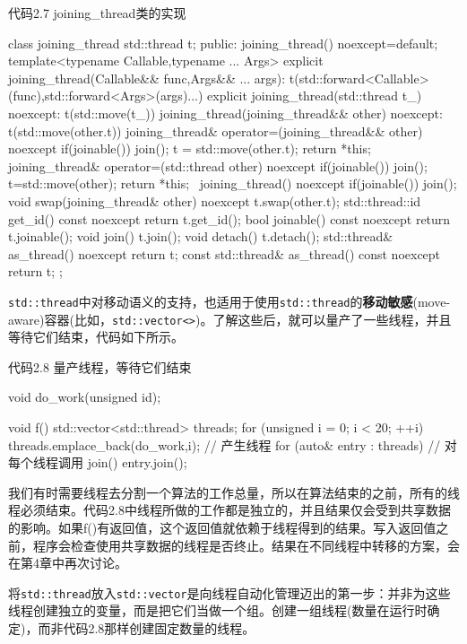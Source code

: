 代码2.7 joining\_thread类的实现

\begin{cpp}
class joining_thread
{
  std::thread t;
public:
  joining_thread() noexcept=default;
  template<typename Callable,typename ... Args>
  explicit joining_thread(Callable&& func,Args&& ... args):
    t(std::forward<Callable>(func),std::forward<Args>(args)...)
  {}
  explicit joining_thread(std::thread t_) noexcept:
    t(std::move(t_))
  {}
  joining_thread(joining_thread&& other) noexcept:
    t(std::move(other.t))
  {}
  joining_thread& operator=(joining_thread&& other) noexcept
  {
    if(joinable()){
      join();
    }
    t = std::move(other.t);
    return *this;
  }
  joining_thread& operator=(std::thread other) noexcept
  {
    if(joinable())
      join();
    t=std::move(other);
    return *this;
  }
  ~joining_thread() noexcept
  {
    if(joinable())
    join();
  }
  void swap(joining_thread& other) noexcept
  {
    t.swap(other.t);
  }
  std::thread::id get_id() const noexcept{
    return t.get_id();
  }
  bool joinable() const noexcept
  {
    return t.joinable();
  }
  void join()
  {
    t.join();
  }
  void detach()
  {
    t.detach();
  }
  std::thread& as_thread() noexcept
  {
    return t;
  }
  const std::thread& as_thread() const noexcept
  {
    return t;
  }
};
\end{cpp}

\texttt{std::thread}中对移动语义的支持，也适用于使用\texttt{std::thread}的\textbf{移动敏感}(move-aware)容器(比如，\texttt{std::vector<>})。了解这些后，就可以量产了一些线程，并且等待它们结束，代码如下所示。

代码2.8 量产线程，等待它们结束

\begin{cpp}
void do_work(unsigned id);

void f()
{
  std::vector<std::thread> threads;
  for (unsigned i = 0; i < 20; ++i)
  {
    threads.emplace_back(do_work,i); // 产生线程
  }
  for (auto& entry : threads) // 对每个线程调用 join()
    entry.join();
}
\end{cpp}

我们有时需要线程去分割一个算法的工作总量，所以在算法结束的之前，所有的线程必须结束。代码2.8中线程所做的工作都是独立的，并且结果仅会受到共享数据的影响。如果f()有返回值，这个返回值就依赖于线程得到的结果。写入返回值之前，程序会检查使用共享数据的线程是否终止。结果在不同线程中转移的方案，会在第4章中再次讨论。

将\texttt{std::thread}放入\texttt{std::vector}是向线程自动化管理迈出的第一步：并非为这些线程创建独立的变量，而是把它们当做一个组。创建一组线程(数量在运行时确定)，而非代码2.8那样创建固定数量的线程。

